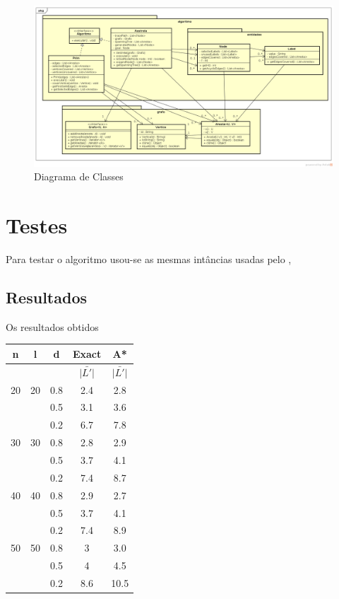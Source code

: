 \documentclass[12pt]{article}
\begin{document}
		\begin{landscape}
		\centering
		\begin{figure}[p]
		\includegraphics[width=1.4\textwidth]{ClassDiagram.png}
		\caption{Diagrama de Classes}
		\label{fig:classDiagram}
		\end{figure}
		\end{landscape}
		\restoregeometry

\section{Testes}\label{sec:testes}
	
	Para testar o algoritmo usou-se as mesmas intâncias usadas pelo \cite{Consoli:2009}, 

	\subsection{Resultados}\label{sec:resultados}
		
		Os resultados obtidos 

		\begin{tabular}{c|c|c|c|c} \hline
			n & l & d & Exact & A* \\ \hline
			& & & $\bar{|L'|}$ & $\bar{|L'|}$ \\ \hline
			20 & 20 & 0.8 & 2.4 & 2.8\\
			 &  & 0.5 & 3.1 & 3.6\\
			 &  & 0.2 & 6.7 & 7.8\\ \hline
			30 & 30 & 0.8 & 2.8 & 2.9 \\
			 &  & 0.5 & 3.7 & 4.1\\
			 &  & 0.2 & 7.4 & 8.7\\ \hline
			40 & 40 & 0.8 & 2.9 & 2.7\\
			 &  & 0.5 & 3.7 & 4.1\\
			 &  & 0.2 & 7.4 & 8.9\\ \hline
			50 & 50 & 0.8 & 3 & 3.0\\
			 &  & 0.5 & 4 & 4.5\\
			 &  & 0.2 & 8.6 & 10.5\\ \hline
		\end{tabular}
\end{document}
